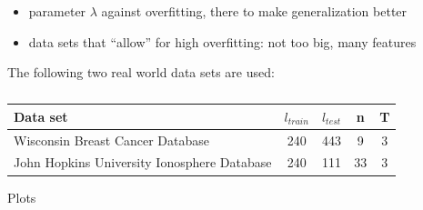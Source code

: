 \begin{itemize}
	\item parameter \(\lambda\) against overfitting, there to make generalization better
	\item data sets that ``allow'' for high overfitting: not too big, many features
\end{itemize}

The following two real world data sets are used:

\begin{center}
\begin{table}[H]%
	\begin{tabular}{lcccc}
		\hline
    Data set & \(l_{train}\) & \(l_{test}\) & n & T \\
		\hline
		Wisconsin Breast Cancer Database & 240 & 443 & 9 & 3 \\
		John Hopkins University Ionosphere Database & 240 & 111 & 33 & 3
	\end{tabular}
	\caption{}
\end{table}
\end{center}


Plots

